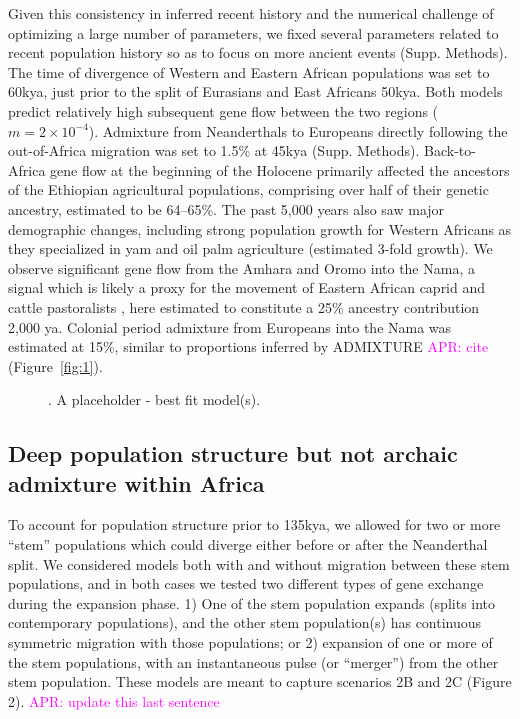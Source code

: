 \documentclass[]{article}
\newcommand{\aprcomment}[1]{{\textcolor{magenta}{APR: #1}}}
\begin{document}
Given this consistency in inferred recent history and the numerical challenge
of optimizing a large number of parameters, we fixed several parameters related
to recent population history so as to focus on more ancient events (Supp.
Methods). The time of divergence of Western and Eastern African populations was
set to 60kya, just prior to the split of Eurasians and East Africans 50kya. Both
models predict relatively high subsequent gene flow between the two regions
($m=2\times10^{-4}$). Admixture from Neanderthals to Europeans directly
following the out-of-Africa migration was set to 1.5\% at 45kya (Supp.
Methods). Back-to-Africa gene flow at the beginning of the Holocene primarily
affected the ancestors of the Ethiopian agricultural populations, comprising
over half of their genetic ancestry, estimated to be 64--65\%. The past 5,000
years also saw major demographic changes, including strong population growth
for Western Africans as they specialized in yam and oil palm agriculture
(estimated 3-fold growth). We observe significant gene flow from the Amhara and
Oromo into the Nama, a signal which is likely a proxy for the movement of
Eastern African caprid and cattle pastoralists
\citep{Henn2008-xo,Breton2014-xb}, here estimated to constitute a 25\% ancestry
contribution 2,000 ya. Colonial period admixture from Europeans into the Nama
was estimated at 15\%, similar to proportions inferred by ADMIXTURE
\aprcomment{cite} (Figure~\ref{fig:1}).

\begin{figure}[ht]
\begin{center}
\makebox[\textwidth][c]{} %
\caption{\textbf{}.
    A placeholder - best fit model(s).
}
\label{fig:2}
\end{center}
\end{figure}

\subsection*{Deep population structure but not archaic admixture within Africa}

To account for population structure prior to 135kya, we allowed for two or more
“stem” populations which could diverge either before or after the Neanderthal
split. We considered models both with and without migration between these stem
populations, and in both cases we tested two different types of gene exchange
during the expansion phase. 1) One of the stem population expands (splits into
contemporary populations), and the other stem population(s) has continuous
symmetric migration with those populations; or 2) expansion of one or more of
the stem populations, with an instantaneous pulse (or “merger”) from the other
stem population. These models are meant to capture scenarios 2B and 2C (Figure
2). \aprcomment{update this last sentence}
\end{document}
